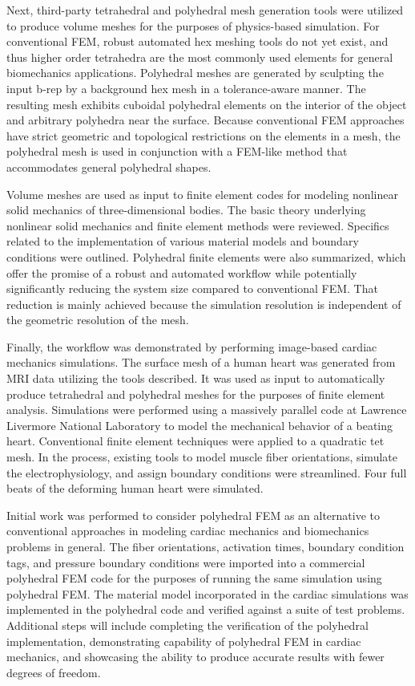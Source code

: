 Next, third-party tetrahedral and polyhedral mesh generation tools were utilized to produce volume meshes for the purposes of physics-based simulation. For conventional FEM, robust automated hex meshing tools do not yet exist, and thus higher order tetrahedra are the most commonly used elements for general biomechanics applications. Polyhedral meshes are generated by sculpting the input b-rep by a background hex mesh in a tolerance-aware manner. The resulting mesh exhibits cuboidal polyhedral elements on the interior of the object and arbitrary polyhedra near the surface. Because conventional FEM approaches have strict geometric and topological restrictions on the elements in a mesh, the polyhedral mesh is used in conjunction with a FEM-like method that accommodates general polyhedral shapes.

Volume meshes are used as input to finite element codes for modeling nonlinear solid mechanics of three-dimensional bodies. The basic theory underlying nonlinear solid mechanics and finite element methods were reviewed. Specifics related to the implementation of various material models and boundary conditions were outlined. Polyhedral finite elements were also summarized, which offer the promise of a robust and automated workflow while potentially significantly reducing the system size compared to conventional FEM. That reduction is mainly achieved because the simulation resolution is independent of the geometric resolution of the mesh.

Finally, the workflow was demonstrated by performing image-based cardiac mechanics simulations. The surface mesh of a human heart was generated from MRI data utilizing the tools described. It was used as input to automatically produce tetrahedral and polyhedral meshes for the purposes of finite element analysis. Simulations were performed using a massively parallel code at Lawrence Livermore National Laboratory to model the mechanical behavior of a beating heart. Conventional finite element techniques were applied to a quadratic tet mesh. In the process, existing tools to model muscle fiber orientations, simulate the electrophysiology, and assign boundary conditions were streamlined. Four full beats of the deforming human heart were simulated.

Initial work was performed to consider polyhedral FEM as an alternative to conventional approaches in modeling cardiac mechanics and biomechanics problems in general. The fiber orientations, activation times, boundary condition tags, and pressure boundary conditions were imported into a commercial polyhedral FEM code for the purposes of running the same simulation using polyhedral FEM. The material model incorporated in the cardiac simulations was implemented in the polyhedral code and verified against a suite of test problems. Additional steps will include completing the verification of the polyhedral implementation, demonstrating capability of polyhedral FEM in cardiac mechanics, and showcasing the ability to produce accurate results with fewer degrees of freedom.


